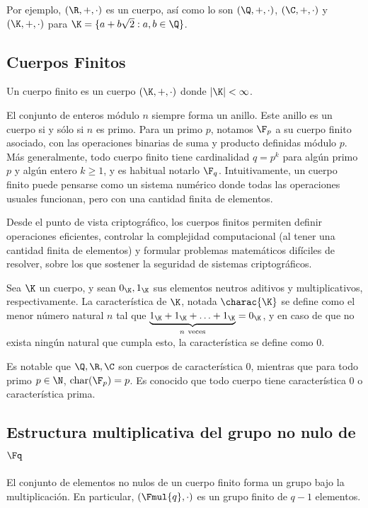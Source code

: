 Por ejemplo, $(\R, +, \cdot)$ es un cuerpo, así como lo son $(\Q, +, \cdot)$, $(\C, +, \cdot)$ y $(\K, +, \cdot)$ para $\K  = \{a + b\sqrt{2}: a, b \in \Q\}$.

\subsection{Cuerpos Finitos}

\begin{definition}
	Un cuerpo finito es un cuerpo $(\K, +, \cdot)$ donde $|\K| < \infty$.
\end{definition}

El conjunto de enteros módulo $n$ siempre forma un anillo. Este anillo es un cuerpo si y sólo si $n$ es primo. Para un primo $p$, notamos $\F_p$ a su cuerpo finito asociado, con las operaciones binarias de suma y producto definidas módulo $p$. Más generalmente, todo cuerpo finito tiene cardinalidad $q = p^k$ para algún primo $p$ y algún entero $k \geq 1$, y es habitual notarlo $\F_q$. Intuitivamente, un cuerpo finito puede pensarse como un sistema numérico donde todas las operaciones usuales funcionan, pero con una cantidad finita de elementos.

Desde el punto de vista criptográfico, los cuerpos finitos permiten definir operaciones eficientes, controlar la complejidad computacional (al tener una cantidad finita de elementos) y formular problemas matemáticos difíciles de resolver, sobre los que sostener la seguridad de sistemas criptográficos.

\begin{definition}[Característica]
	Sea $\K$ un cuerpo, y sean $0_\K, 1_\K$ sus elementos neutros aditivos y multiplicativos, respectivamente. La característica de $\K$, notada $\charac{\K}$ se define como el menor número natural $n$ tal que $\underbrace{1_\K + 1_\K + \ldots + 1_\K}_{n\ \text{veces}} = 0_\K$, y en caso de que no exista ningún natural que cumpla esto, la característica se define como $0$.
\end{definition}

Es notable que $\Q, \R, \C$ son cuerpos de característica $0$, mientras que para todo primo $p \in \N$, $\mathrm{char}(\F_p) = p$. Es conocido que todo cuerpo tiene característica $0$ o característica prima.

\subsection{Estructura multiplicativa del grupo no nulo de \texorpdfstring{$\Fq$}{Fq}}
El conjunto de elementos no nulos de un cuerpo finito forma un grupo bajo la multiplicación. En particular, $(\Fmul{q}, \cdot)$ es un grupo finito de $q - 1$ elementos.

